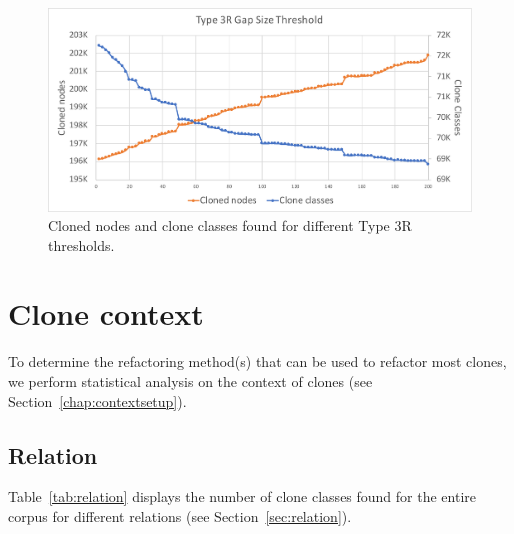 \begin{figure}[H]
  \includegraphics[width=1\textwidth]{img/T3R}
  \caption{Cloned nodes and clone classes found for different Type 3R thresholds.}
  \label{fig:t3rgraph}
\end{figure}

\section{Clone context}
To determine the refactoring method(s) that can be used to refactor most clones, we perform statistical analysis on the context of clones (see Section~\ref{chap:contextsetup}).

\subsection{Relation}
Table~\ref{tab:relation} displays the number of clone classes found for the entire corpus for different relations (see Section~\ref{sec:relation}).

